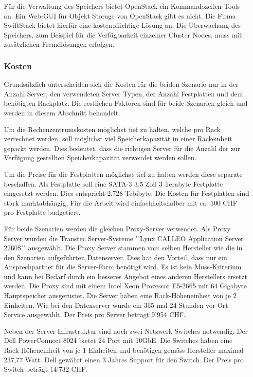 Für die Verwaltung des Speichers bietet OpenStack ein Kommandozeilen-Tools an. Ein Web-GUI für Objekt Storage von OpenStack gibt es nicht. Die Firma SwiftStack bietet hierfür eine kostenpflichtige Lösung an. Die Überwachung des Speichers, zum Beispiel für die Verfügbarkeit einzelner Cluster Nodes, muss mit zusätzlichen Fremdlösungen erfolgen. 

\subsubsection*{Kosten}
Grundsätzlich unterscheiden sich die Kosten für die beiden Szenario nur in der Anzahl Server, den verwendeten Server Typen, der Anzahl Festplatten und dem benötigten Rackplatz. Die restlichen Faktoren sind für beide Szenarien gleich und werden in diesem Abschnitt behandelt.

Um die Rechenzentrumskosten möglichst tief zu halten, welche pro Rack verrechnet werden, soll möglichst viel Speicherkapazität in einer Rackeinheit gepackt werden. Dies bedeutet, dass die richtigen Server für die Anzahl der zur Verfügung gestellten Speicherkapazität verwendet werden sollen.

Um die Preise für die Festplatten möglichst tief zu halten werden diese separate beschaffen. Als Festplatte soll eine SATA-3 3.5 Zoll 3 Terabyte Festplatte eingesetzt werden. Dies entspricht 2.728 Tebibyte. Die Kosten für Festplatten sind stark marktabhängig, Für die Arbeit wird einfachheitshalber mit ca. 300 CHF pro Festplatte budgetiert.

Für beide Szenarien werden die gleichen Proxy-Server verwendet. Als Proxy Server wurden die Transtec Server-Systeme "'Lynx CALLEO Application Server 2260S'" ausgewählt. Die Proxy Server stammen vom selben Hersteller wie die in den Szenarien aufgeführten Datenserver. Dies hat den Vorteil, dass nur ein Ansprechpartner für die Server-Farm benötigt wird. Es ist kein Muss-Kriterium und kann bei Bedarf durch ein besseres Angebot eines anderen Herstellers ersetzt werden. Die Proxy sind mit einem Intel Xeon Prozessor E5-2665 mit 64 Gigabyte Hauptspeicher ausgerüstet. Die Server haben eine Rack-Höheneinheit von je 2 Einheiten. Wie bei den Datenserver wurde ein 365 mal 24 Stunden vor Ort Service ausgewählt. Der Preis pro Server beträgt 9'954 CHF.

Neben der Server Infrastruktur sind noch zwei Netzwerk-Switches notwendig. Der Dell PowerConnect 8024 bietet 24 Port mit 10GbE. Die Switches haben eine Rack-Höheneinheit von je 1 Einheiten und benötigen gemäss Hersteller maximal 237,77 Watt. Dell gewährt einen 3 Jahres Support für den Switch. Der Preis pro Switch beträgt 14'732 CHF.

